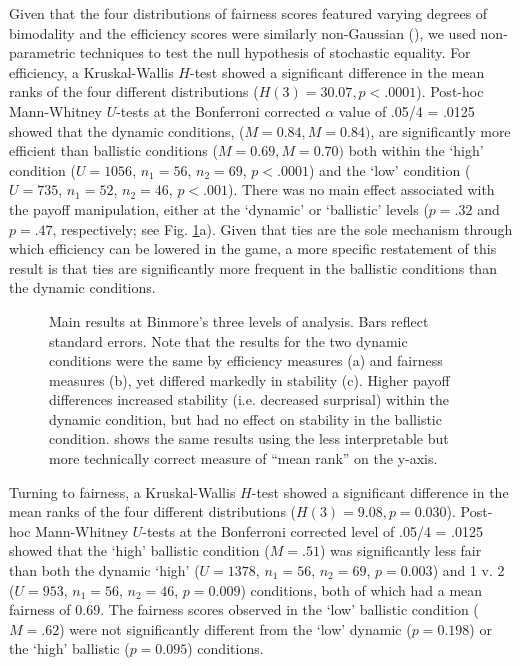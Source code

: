 \documentclass[10pt,letterpaper]{article}
\begin{document}
Given that the four distributions of fairness scores featured varying degrees of bimodality and the efficiency scores were similarly non-Gaussian (), we used non-parametric techniques to test the null hypothesis of stochastic equality. For efficiency, a Kruskal-Wallis $H$-test showed a significant difference in the mean ranks of the four different distributions ($H(3) = 30.07, p < .0001$). Post-hoc Mann-Whitney $U$-tests at the Bonferroni corrected $\alpha$ value of .05/4 = .0125 showed that the dynamic conditions, ($M = 0.84, M = 0.84)$, are significantly more efficient than ballistic conditions ($M = 0.69, M = 0.70)$ both within the `high' condition ($U = 1056$, $n_1 = 56$, $n_2 = 69$, $p < .0001$) and the `low' condition ($U = 735$, $n_1 = 52$, $n_2 = 46$, $p < .001$). There was no main effect associated with the payoff manipulation, either at the `dynamic' or `ballistic' levels ($p = .32$ and $p = .47$, respectively; see Fig. \ref{Fig2}a). Given that ties are the sole mechanism through which efficiency can be lowered in the game, a more specific restatement of this result is that ties are significantly more frequent in the ballistic conditions than the dynamic conditions.

\begin{figure}[t]
\centering
\caption{Main results at Binmore's three levels of analysis. Bars reflect standard errors. Note that the results for the two dynamic conditions were the same by efficiency measures (a) and fairness measures (b), yet differed markedly in stability (c). Higher payoff differences increased stability (i.e. decreased surprisal) within the dynamic condition, but had no effect on stability in the ballistic condition.  shows the same results using the less interpretable but more technically correct measure of ``mean rank'' on the y-axis.}
\label{Fig2}
\end{figure}

Turning to fairness, a Kruskal-Wallis $H$-test showed a significant difference in the mean ranks of the four different distributions ($H(3) = 9.08, p = 0.030$). Post-hoc Mann-Whitney $U$-tests at the Bonferroni corrected level of .05/4 = .0125 showed that the `high' ballistic condition ($M = .51$)  was significantly less fair than both the dynamic `high' ($U = 1378$, $n_1 = 56$, $n_2 = 69$, $p = 0.003$) and 1 v. 2 ($U =953$, $n_1 = 56$, $n_2 = 46$, $p = 0.009$) conditions, both of which had a mean fairness of $0.69$. The fairness scores observed in the `low' ballistic condition ($M = .62$) were not significantly different from the `low' dynamic ($p = 0.198$) or the `high' ballistic ($p = 0.095$) conditions. 
\end{document}
